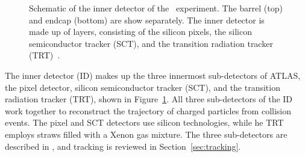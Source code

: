 \begin{figure}[p]
  \caption[
    Schematic of the inner detector of the
    \atlas\ experiment~\cite{1748-0221-3-08-S08003}.
  ]{
    Schematic of the inner detector of the \atlas\ experiment.
    The barrel (top) and endcap (bottom) are show separately.
    The inner detector is made up of layers, consisting of the silicon pixels,
    the silicon semiconductor tracker (SCT), and the transition radiation
    tracker (TRT)~\cite{1748-0221-3-08-S08003}.
  }
  \label{fig:id_cartoon}
\end{figure}

The inner detector (ID) makes up the three innermost sub-detectors of ATLAS,
the pixel detector, silicon semiconductor tracker (SCT), and the transition
radiation tracker (TRT), shown in Figure~\ref{fig:id_cartoon}.
All three sub-detectors of the ID work together to reconstruct the trajectory
of charged particles from collision events.
The pixel and SCT detectors use silicon technologies, while he TRT employs
straws filled with a Xenon gas mixture.
The three sub-detectors are described in ,
and tracking is reviewed in Section~\ref{sec:tracking}.

